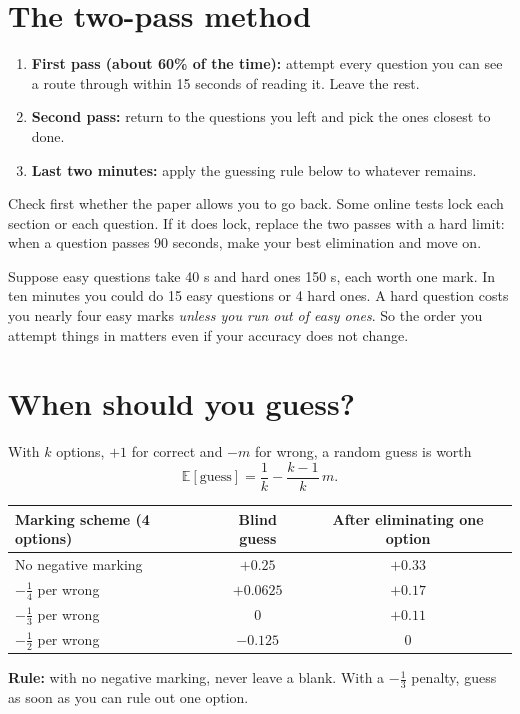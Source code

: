 \documentclass[11pt,a4paper,openany]{report}
\newcommand{\E}{\mathbb{E}}
\begin{document}
\section{The two-pass method}
\begin{enumerate}[nosep]
\item \textbf{First pass (about 60\% of the time):} attempt every question you can see a route through within 15 seconds of reading it. Leave the rest.
\item \textbf{Second pass:} return to the questions you left and pick the ones closest to done.
\item \textbf{Last two minutes:} apply the guessing rule below to whatever remains.
\end{enumerate}
Check first whether the paper allows you to go back. Some online tests lock each section or each question. If it does lock, replace the two passes with a hard limit: when a question passes 90 seconds, make your best elimination and move on.

\begin{why}
Suppose easy questions take 40 s and hard ones 150 s, each worth one mark. In ten minutes you could do 15 easy questions or 4 hard ones. A hard question costs you nearly four easy marks \emph{unless you run out of easy ones}. So the order you attempt things in matters even if your accuracy does not change.
\end{why}

\section{When should you guess?}
With $k$ options, $+1$ for correct and $-m$ for wrong, a random guess is worth
\[\E[\text{guess}]=\frac1k-\frac{k-1}{k}\,m.\]
\begin{center}\small
\begin{tabular}{lcc}
\toprule
Marking scheme (4 options) & Blind guess & After eliminating one option\\\midrule
No negative marking & $+0.25$ & $+0.33$\\
$-\frac14$ per wrong & $+0.0625$ & $+0.17$\\
$-\frac13$ per wrong & $0$ & $+0.11$\\
$-\frac12$ per wrong & $-0.125$ & $0$\\
\bottomrule
\end{tabular}
\end{center}
\textbf{Rule:} with no negative marking, never leave a blank. With a $-\frac13$ penalty, guess as soon as you can rule out one option.
\end{document}
